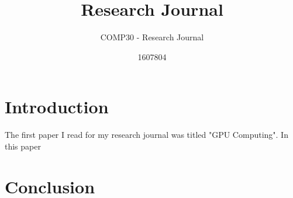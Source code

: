 \documentclass{scrartcl}
\title{Research Journal}
\subtitle{COMP30 - Research Journal}
\author{1607804}
\begin{document}
\maketitle

\section{Introduction}
The first paper I read for my research journal was titled "GPU Computing"\cite {OwensGPU}. In this paper

\section{}


\section{}


\section{}

\section{Conclusion}




\end{document}
